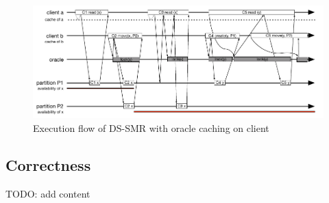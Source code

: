 \begin{figure}
\begin{minipage}[b]{1\linewidth} %
\centering
      \includegraphics[width=0.85\linewidth]{figures/cache}
\end{minipage}
\caption{Execution flow of DS-SMR with oracle caching on client}
\label{fig:cache}
\end{figure}

\subsection{Correctness}
\label{sec:correctness}
TODO: add content